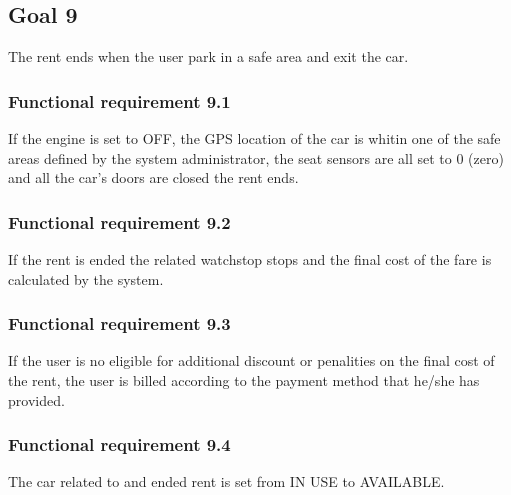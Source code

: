 \subsection{Goal 9}
The rent ends when the user park in a safe area and exit the car.

\setcounter{secnumdepth}{3}
\subsubsection{Functional requirement 9.1}
If the engine is set to OFF, the GPS location of the car is whitin one of the safe areas defined by the system administrator, the seat sensors are all set to 0 (zero) and all the car's doors are closed the rent ends.

\subsubsection{Functional requirement 9.2}
If the rent is ended the related watchstop stops and the final cost of the fare is calculated by the system.

\subsubsection{Functional requirement 9.3}
If the user is no eligible for additional discount or penalities on the final cost of the rent, the user is billed according to the payment method that he/she has provided.

\subsubsection{Functional requirement 9.4}
The car related to and ended rent is set from IN USE to AVAILABLE.
